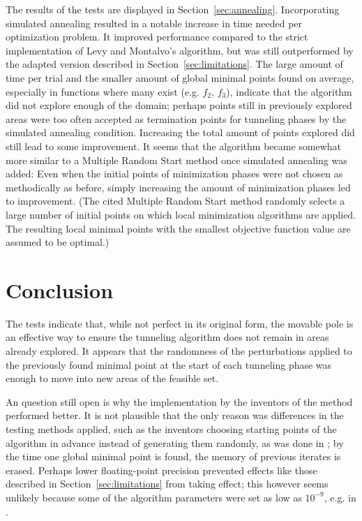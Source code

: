 \documentclass[a4paper,12pt,twoside]{article}
\begin{document}
The results of the tests are displayed in Section~\ref{sec:annealing}. Incorporating simulated annealing resulted in a notable increase in time needed per optimization problem. It improved performance compared to the strict implementation of Levy and Montalvo's algorithm, but was still outperformed by the adapted version described in Section~\ref{sec:limitations}. The large amount of time per trial and the smaller amount of global minimal points found on average, especially in functions where many exist (e.g. $f_2$, $f_3$), indicate that the algorithm did not explore enough of the domain; perhaps points still in previously explored areas were too often accepted as termination points for tunneling phases by the simulated annealing condition. Increasing the total amount of points explored did still lead to some improvement. It seems that the algorithm became somewhat more similar to a Multiple Random Start \cite[\S 4.1.2]{levy_tunneling_1985} method once simulated annealing was added: Even when the initial points of minimization phases were not chosen as methodically as before, simply increasing the amount of minimization phases led to improvement. (The cited Multiple Random Start method randomly selects a large number of initial points on which local minimization algorithms are applied. The resulting local minimal points with the smallest objective function value are assumed to be optimal.)

\section{Conclusion}
The tests indicate that, while not perfect in its original form, the movable pole is an effective way to ensure the tunneling algorithm does not remain in areas already explored. It appears that the randomness of the perturbations applied to the previously found minimal point at the start of each tunneling phase was enough to move into new areas of the feasible set.

An question still open is why the implementation by the inventors of the method performed better. It is not plausible that the only reason was differences in the testing methods applied, such as the inventors choosing starting points of the algorithm in advance instead of generating them randomly, as was done in \cite{heidbrink_nicolasheidbrinkoptimization-seminar_2026}; by the time one global minimal point is found, the memory of previous iterates is erased. Perhaps lower floating-point precision prevented effects like those described in Section~\ref{sec:limitations} from taking effect; this however seems unlikely because some of the algorithm parameters were set as low as $10^{-9}$, e.g. in \cite[\S 4.1.1]{levy_tunneling_1985}.
\end{document}
